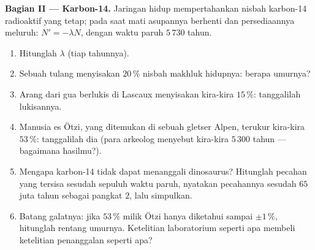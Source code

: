 \begin{problem}
\medskip
\noindent\textbf{Bagian II --- Karbon-14.}
Jaringan hidup mempertahankan nisbah karbon-14 radioaktif yang
tetap; pada saat mati asupannya berhenti dan persediaannya meluruh:
$N' = -\lambda N$, dengan waktu paruh $5\,730$ tahun.
\begin{enumerate}[resume]
  \item Hitunglah $\lambda$ (tiap tahunnya).
  \item Sebuah tulang menyisakan $20\,\%$ nisbah makhluk hidupnya: berapa
        umurnya?
  \item Arang dari gua berlukis di Lascaux menyisakan
        kira-kira $15\,\%$: tanggalilah lukisannya.
  \item Manusia es Ötzi, yang ditemukan di sebuah gletser Alpen, terukur
        kira-kira $53\,\%$: tanggalilah dia (para arkeolog menyebut kira-kira
        $5\,300$ tahun --- bagaimana hasilmu?).
  \item Mengapa karbon-14 tidak dapat menanggali dinosaurus? Hitunglah
        pecahan yang tersisa sesudah sepuluh waktu paruh, nyatakan
        pecahannya sesudah $65$ juta tahun sebagai pangkat $2$,
        lalu simpulkan.
  \item Batang galatnya: jika $53\,\%$ milik Ötzi hanya diketahui sampai
        $\pm 1\,\%$, hitunglah rentang umurnya. Ketelitian laboratorium
        seperti apa membeli ketelitian penanggalan seperti apa?
\end{enumerate}


\end{problem}
